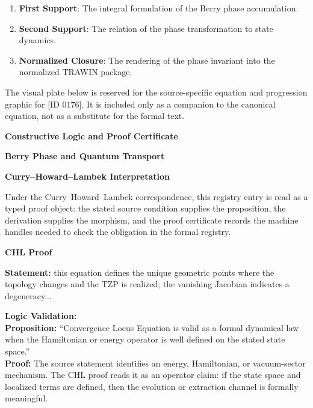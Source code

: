\begin{enumerate}[leftmargin=1.6em,itemsep=6pt,topsep=4pt]
\item \textbf{First Support}: The integral formulation of the Berry phase accumulation.
\item \textbf{Second Support}: The relation of the phase transformation to state dynamics.
\item \textbf{Normalized Closure}: The rendering of the phase invariant into the normalized TRAWIN package.
\end{enumerate}

\begingroup\footnotesize\sloppy
The visual plate below is reserved for the source-specific equation and progression graphic for [ID 0176]. It is included only as a companion to the canonical equation, not as a substitute for the formal text.
\par\endgroup
\ifTZPDarkEdition
{}
\fi

\clearpage
\begingroup\tzpsupportsetup
\noindent\textbf{\fontsize{10.8pt}{12.8pt}\selectfont [ID 0176] Constructive Logic and Proof Certificate}\par
\noindent\textbf{\fontsize{10pt}{12pt}\selectfont Berry Phase and Quantum Transport}\par
\vspace{0.45em}
\begingroup
\footnotesize
\setlength{\parskip}{0.22em}
\setlength{\parindent}{0pt}
\noindent\textbf{Curry--Howard--Lambek Interpretation}\par
Under the Curry--Howard--Lambek correspondence, this registry entry is read as a typed proof
object: the stated source condition supplies the proposition, the derivation supplies the
morphism, and the proof certificate records the machine handles needed to check the obligation
in the formal registry.

\vspace{0.45em}
\noindent\textbf{CHL Proof}\par
\textbf{Statement:} this equation defines the unique geometric points where the topology changes and the TZP
is realized; the vanishing Jacobian indicates a degeneracy...

\textbf{Logic Validation:}\\
\textbf{Proposition:} ``Convergence Locus Equation is valid as a formal dynamical law when the Hamiltonian or
energy operator is well defined on the stated state space.''\\
\textbf{Proof:} The source statement identifies an energy, Hamiltonian, or vacuum-sector mechanism. The
CHL proof reads it as an operator claim: if the state space and localized terms are
defined, then the evolution or extraction channel is formally meaningful.

